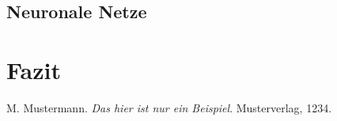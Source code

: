 \documentclass[a4,german]{article}
\begin{document}
\subsection{Neuronale Netze}


\section{Fazit}




\begin{thebibliography}{99}
	
 M. Mustermann. \textit{Das hier ist nur ein Beispiel}. Musterverlag, 1234.

\end{thebibliography}
\end{document}
